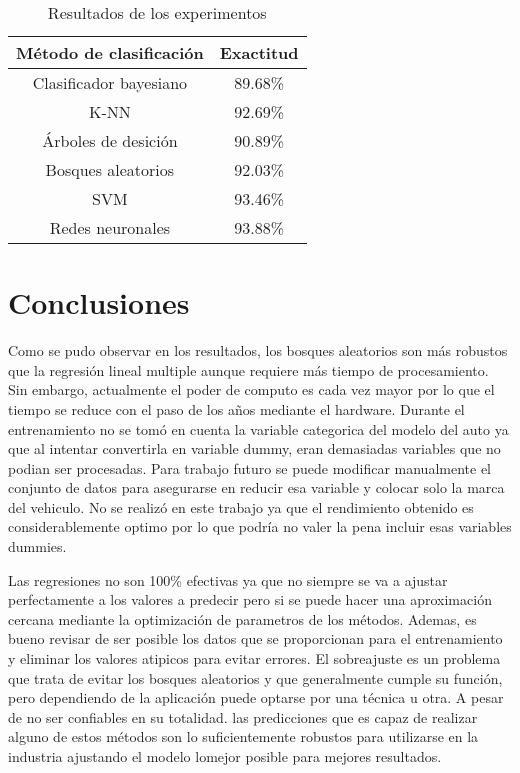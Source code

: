 \documentclass[conference]{IEEEtran}
\begin{document}
\begin{table}[H]
\begin{center}
\begin{tabular}{| c | c |}
\hline
Método de clasificación & Exactitud \\ \hline
Clasificador bayesiano  & 89.68\% \\ \hline
K-NN & 92.69\%\\ \hline
Árboles de desición & 90.89\% \\ \hline
Bosques aleatorios & 92.03\% \\ \hline
SVM & 93.46\%  \\ \hline
Redes neuronales & 93.88\% \\ \hline
\end{tabular}
\caption{Resultados de los experimentos}
\end{center}
\end{table}



\section*{Conclusiones}
Como se pudo observar en los resultados, los bosques aleatorios son más robustos que la regresión lineal multiple aunque requiere más tiempo de procesamiento. Sin embargo, actualmente el poder de computo es cada vez mayor por lo que el tiempo se reduce con el paso de los años mediante el hardware. Durante el entrenamiento no se tomó en cuenta la variable categorica del modelo del auto ya que al intentar convertirla en variable dummy, eran demasiadas variables que no podian ser procesadas. Para trabajo futuro se puede modificar manualmente el conjunto de datos para asegurarse en reducir esa variable y colocar solo la marca del vehiculo. No se realizó en este trabajo ya que el rendimiento obtenido es considerablemente optimo por lo que podría no valer la pena incluir esas variables dummies. 

Las regresiones no son 100\% efectivas ya que no siempre se va a ajustar perfectamente a los valores a predecir pero si se puede hacer una aproximación cercana mediante la optimización de parametros de los métodos. Ademas, es bueno revisar de ser posible los datos que se proporcionan para el entrenamiento y eliminar los valores atipicos para evitar errores. El sobreajuste es un problema que trata de evitar los bosques aleatorios y que generalmente cumple su función, pero dependiendo de la aplicación puede optarse por una técnica u otra. A pesar de no ser confiables en su totalidad. las predicciones que es capaz de realizar alguno de estos métodos son lo suficientemente robustos para utilizarse en la industria ajustando el modelo lomejor posible para mejores resultados. 
\end{document}
